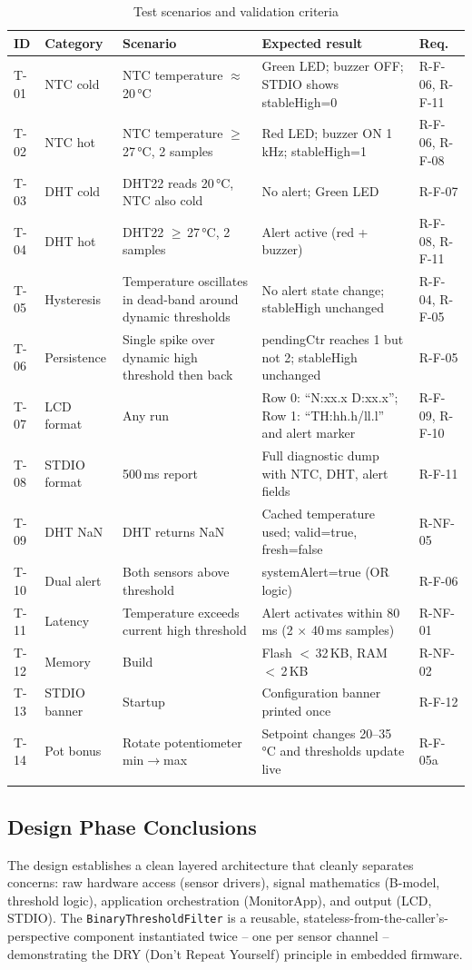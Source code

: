 \documentclass[12pt]{article}
\begin{document}
\begin{longtable}{p{0.9cm} p{2.3cm} p{4.8cm} p{4.3cm} p{0.9cm}}
\toprule
\textbf{ID} & \textbf{Category} & \textbf{Scenario} & \textbf{Expected result} & \textbf{Req.} \\
\midrule
\endfirsthead
T-01 & NTC cold & NTC temperature $\approx$\,20\,°C & Green LED; buzzer OFF; STDIO shows stableHigh=0 & R-F-06, R-F-11 \\
T-02 & NTC hot & NTC temperature $\geq$\,27\,°C, 2 samples & Red LED; buzzer ON 1\,kHz; stableHigh=1 & R-F-06, R-F-08 \\
T-03 & DHT cold & DHT22 reads 20\,°C, NTC also cold & No alert; Green LED & R-F-07 \\
T-04 & DHT hot & DHT22 $\geq$\,27\,°C, 2 samples & Alert active (red + buzzer) & R-F-08, R-F-11 \\
T-05 & Hysteresis & Temperature oscillates in dead-band around dynamic thresholds & No alert state change; stableHigh unchanged & R-F-04, R-F-05 \\
T-06 & Persistence & Single spike over dynamic high threshold then back & pendingCtr reaches 1 but not 2; stableHigh unchanged & R-F-05 \\
T-07 & LCD format & Any run & Row 0: ``N:xx.x D:xx.x''; Row 1: ``TH:hh.h/ll.l'' and alert marker & R-F-09, R-F-10 \\
T-08 & STDIO format & 500\,ms report & Full diagnostic dump with NTC, DHT, alert fields & R-F-11 \\
T-09 & DHT NaN & DHT returns NaN & Cached temperature used; valid=true, fresh=false & R-NF-05 \\
T-10 & Dual alert & Both sensors above threshold & systemAlert=true (OR logic) & R-F-06 \\
T-11 & Latency & Temperature exceeds current high threshold & Alert activates within 80\,ms (2 $\times$ 40\,ms samples) & R-NF-01 \\
T-12 & Memory & Build & Flash $<$\,32\,KB, RAM $<$\,2\,KB & R-NF-02 \\
T-13 & STDIO banner & Startup & Configuration banner printed once & R-F-12 \\
T-14 & Pot bonus & Rotate potentiometer min$\rightarrow$max & Setpoint changes 20--35\,°C and thresholds update live & R-F-05a \\
\bottomrule
\caption{Test scenarios and validation criteria}
\label{tab:tests}
\end{longtable}

\subsection{Design Phase Conclusions}
\hspace{0.8cm} The design establishes a clean layered architecture that cleanly separates concerns: raw hardware access (sensor drivers), signal mathematics (B-model, threshold logic), application orchestration (MonitorApp), and output (LCD, STDIO). The \texttt{BinaryThresholdFilter} is a reusable, stateless-from-the-caller's-perspective component instantiated twice -- one per sensor channel -- demonstrating the DRY (Don't Repeat Yourself) principle in embedded firmware.
\end{document}
